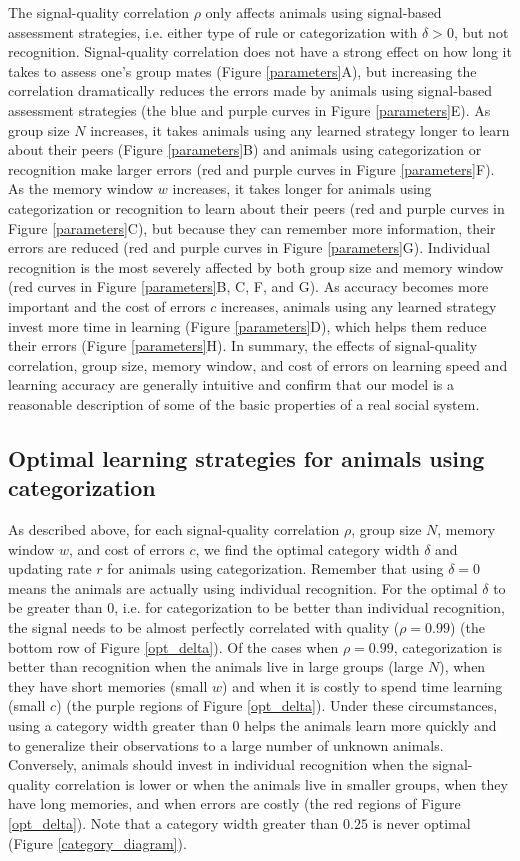 The signal-quality correlation $\rho$ only affects animals using signal-based assessment strategies, i.e. either type of rule or categorization with $\delta>0$, but not recognition. Signal-quality correlation does not have a strong effect on how long it takes to assess one's group mates (Figure \ref{parameters}A), but increasing the correlation dramatically reduces the errors made by animals using signal-based assessment strategies (the blue and purple curves in Figure \ref{parameters}E). As group size $N$ increases, it takes animals using any learned strategy longer to learn about their peers (Figure \ref{parameters}B) and animals using categorization or recognition make larger errors (red and purple curves in Figure \ref{parameters}F). As the memory window $w$ increases, it takes longer for animals using categorization or recognition to learn about their peers (red and purple curves in Figure \ref{parameters}C), but because they can remember more information, their errors are reduced (red and purple curves in Figure \ref{parameters}G). Individual recognition is the most severely affected by both group size and memory window (red curves in Figure \ref{parameters}B, C, F, and G). As accuracy becomes more important and the cost of errors $c$ increases, animals using any learned strategy invest more time in learning (Figure \ref{parameters}D), which helps them reduce their errors (Figure \ref{parameters}H). In summary, the effects of  signal-quality correlation, group size, memory window, and cost of errors on learning speed and learning accuracy are generally intuitive and confirm that our model is a reasonable description of some of the basic properties of a real social system. 
  
\subsection*{Optimal learning strategies for animals using categorization}
As described above, for each signal-quality correlation $\rho$, group size $N$, memory window $w$, and cost of errors $c$, we find the optimal category width $\delta$ and updating rate $r$ for animals using categorization. Remember that using $\delta=0$ means the animals are actually using individual recognition. For the optimal $\delta$ to be greater than $0$, i.e. for categorization to be better than individual recognition, the signal needs to be almost perfectly correlated with quality ($\rho=0.99$) (the bottom row of Figure \ref{opt_delta}). Of the cases when $\rho=0.99$, categorization is better than recognition when the animals live in large groups (large $N$), when they have short memories (small $w$) and when it is  costly to spend time learning (small $c$) (the purple regions of Figure \ref{opt_delta}). Under these circumstances, using a category width greater than $0$ helps the animals learn more quickly and to generalize their observations to a large number of unknown animals. Conversely, animals should invest in individual recognition when the signal-quality correlation is lower or when the animals live in smaller groups, when they have long memories, and when errors are costly (the red regions of Figure \ref{opt_delta}). Note that a category width greater than $0.25$ is never optimal (Figure \ref{category_diagram}). 

